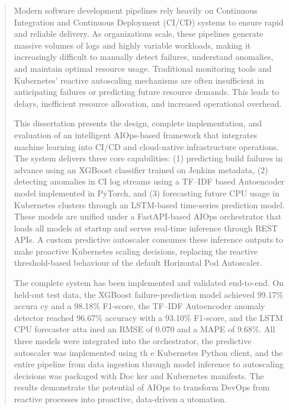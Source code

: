 \documentclass[12pt]{report}
\begin{document}
\clearpage
{}
\setcounter{page}{1}


\tableofcontents

\clearpage
\listoffigures
{}

\clearpage
\listoftables
{}

\clearpage

\begin{abstract}
\setcounter{page}{5}
\thispagestyle{plain}

Modern software development pipelines rely heavily on Continuous Integration and Continuous Deployment (CI/CD) systems to ensure rapid and reliable delivery. As organizations scale, these pipelines generate massive volumes of logs and highly variable workloads, making it increasingly difficult to manually detect failures, understand anomalies, and maintain optimal resource usage. Traditional monitoring tools and Kubernetes' reactive autoscaling mechanisms are often insufficient in anticipating failures or predicting future resource demands. This leads to delays, inefficient resource allocation, and increased operational overhead.

This dissertation presents the design, complete implementation, and evaluation of an intelligent AIOps-based framework that integrates machine learning into CI/CD and cloud-native infrastructure operations. The system delivers three core capabilities: (1) predicting build failures in advance using an XGBoost classifier trained on Jenkins metadata, (2) detecting anomalies in CI log streams using a TF--IDF based Autoencoder model implemented in PyTorch, and (3) forecasting future CPU usage in Kubernetes clusters through an LSTM-based time-series prediction model. These models are unified under a FastAPI-based AIOps orchestrator that loads all models at startup and serves real-time inference through REST APIs. A custom predictive autoscaler consumes these inference outputs to make proactive Kubernetes scaling decisions, replacing the reactive threshold-based behaviour of the default Horizontal Pod Autoscaler.

The complete system has been implemented and validated end-to-end. On held-out test data, the XGBoost failure-prediction model achieved 99.17\% accura
cy and a 98.18\% F1-score, the TF--IDF Autoencoder anomaly detector reached 96.67\% accuracy with a 93.10\% F1-score, and the LSTM CPU forecaster atta
ined an RMSE of 0.070 and a MAPE of 9.68\%. All three models were integrated into the orchestrator, the predictive autoscaler was implemented using th
e Kubernetes Python client, and the entire pipeline from data ingestion through model inference to autoscaling decisions was packaged with Doc
ker and Kubernetes manifests. The results demonstrate the potential of AIOps to transform DevOps from reactive processes into proactive, data-driven a
utomation.

\end{abstract}
\end{document}
